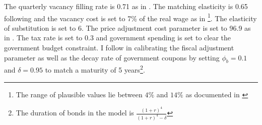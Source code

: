 The quarterly vacancy filling rate is 0.71 as in \cite{Wouter2000}. The matching elasticity is 0.65 following \cite{ravn2017job} and the vacancy cost is set to 7\% of the real wage as in \cite{Christiano2016}\footnote{The range of plausible values lie between $4\%$ and $14\%$ as documented in \cite{SilvaToledo}}. The elasticity of substitution is set to 6. The price adjustment cost parameter is set to 96.9 as in \cite{ravn2017job}. The tax rate is set to 0.3 and government spending is set to clear the government budget constraint.  I follow \cite{AuclertMicroJumpsMacroHumps} in calibrating the fiscal adjustment parameter  as well as the decay rate of government coupons by setting $\phi_{b} = 0.1$ and $\delta = 0.95$ to match a maturity of 5 years\footnote{The duration of bonds in the model is $\frac{(1+r)^4}{(1+r)^4 - \delta}$ }.


